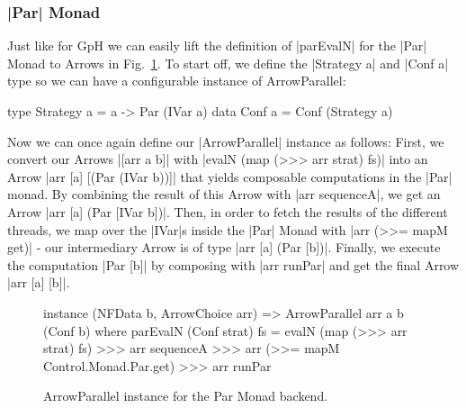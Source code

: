 \subsubsection{|Par| Monad}
Just like for GpH we can easily lift the definition of |parEvalN| for the |Par| Monad to Arrows in Fig.~\ref{fig:ArrowParallelParMonad}. To start off, we define the |Strategy a| and |Conf a| type so we can have a configurable instance of ArrowParallel:
\begin{code}
type Strategy a = a -> Par (IVar a)
data Conf a = Conf (Strategy a)
\end{code}
Now we can once again define our |ArrowParallel| instance as follows: First, we convert our Arrows |[arr a b]| with |evalN (map (>>> arr strat) fs)| into an Arrow |arr [a] [(Par (IVar b))]| that yields composable computations in the |Par| monad. By combining the result of this Arrow with |arr sequenceA|, we get an Arrow |arr [a] (Par [IVar b])|. Then, in order to fetch the results of the different threads, we map over the |IVar|s inside the |Par| Monad with |arr (>>= mapM get)| - our intermediary Arrow is of type |arr [a] (Par [b])|. Finally, we execute the computation |Par [b]| by composing with |arr runPar| and get the final Arrow |arr [a] [b]|.
\begin{figure}[h]
\begin{code}
instance (NFData b, ArrowChoice arr) => ArrowParallel arr a b (Conf b) where
    parEvalN (Conf strat) fs = evalN (map (>>> arr strat) fs) >>>
                    arr sequenceA >>>
                    arr (>>= mapM Control.Monad.Par.get) >>>
                    arr runPar
\end{code} %
\caption{ArrowParallel instance for the Par Monad backend.}
\label{fig:ArrowParallelParMonad}
\end{figure}

